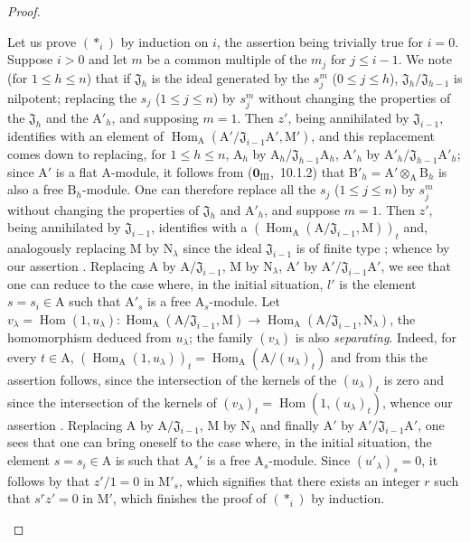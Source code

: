 \begin{proof}
\begin{enumerate}[label=(\roman*)]
  Let us prove $(*_i)$ by induction on $i$, the assertion being trivially true for $i=0$.
  Suppose $i>0$ and let $m$ be a common multiple of the $m_j$ for $j\leq i-1$.
  We note (for $1\leq h\leq n$) that if $\mathfrak{J}_h$ is the ideal generated by the $s_j^m$ ($0\leq j\leq h$), $\mathfrak{J}_h/\mathfrak{J}_{h-1}$ is nilpotent; replacing the $s_j$ ($1\leq j\leq n$) by $s_j^m$ without changing the properties of the $\mathfrak{J}_h$ and the $\mathrm{A}'_h$, and supposing $m=1$.
  Then $z'$, being annihilated by $\mathfrak{J}_{i-1}$, identifies with an element of $\operatorname{Hom}_\mathrm{A}(\mathrm{A}'/\mathfrak{J}_{i-1}\mathrm{A}',\mathrm{M}')$, and this replacement comes down to replacing, for $1\leq h\leq n$, $\mathrm{A}_h$ by $\mathrm{A}_h/\mathfrak{J}_{h-1}\mathrm{A}_h$, $\mathrm{A}'_h$ by $\mathrm{A}'_h/\mathfrak{J}_{h-1}\mathrm{A}'_h$; since $\mathrm{A}'$ is a flat $\mathrm{A}$-module, it follows from ($\mathbf{0}_{\mathrm{III}}$,~10.1.2) that $\mathrm{B}'_h=\mathrm{A}'\otimes_\mathrm{A}\mathrm{B}_h$ is also a free $\mathrm{B}_h$-module.
  One can therefore
  replace all the $s_j$ ($1\leq j\leq n$) by $s_j^m$ without changing the properties of $\mathfrak{J}_h$ and $\mathrm{A}'_h$, and suppose $m=1$.
  Then $z'$, being annihilated by $\mathfrak{J}_{i-1}$, identifies with a $(\operatorname{Hom}_\mathrm{A}(\mathrm{A}/\mathfrak{J}_{i-1},\mathrm{M}))_t$ and, analogously replacing $\mathrm{M}$ by $\mathrm{N}_\lambda$ since the ideal $\mathfrak{J}_{i-1}$ is of finite type ; whence by our assertion .
  Replacing $\mathrm{A}$ by $\mathrm{A}/\mathfrak{J}_{i-1}$, $\mathrm{M}$ by $\mathrm{N}_\lambda$, $\mathrm{A}'$ by $\mathrm{A}'/\mathfrak{J}_{i-1}\mathrm{A}'$, we see that one can reduce to the case where, in the initial situation, $l'$ is the element $s=s_i\in\mathrm{A}$ such that $\mathrm{A}'_s$ is a free $\mathrm{A}_s$-module.
  Let $v_\lambda=\operatorname{Hom}(1,u_\lambda):\operatorname{Hom}_\mathrm{A}(\mathrm{A}/\mathfrak{J}_{i-1},\mathrm{M})\to\operatorname{Hom}_\mathrm{A}(\mathrm{A}/\mathfrak{J}_{i-1},\mathrm{N}_\lambda)$, the homomorphism deduced from $u_\lambda$; the family $(v_\lambda)$ is also \emph{separating}.
  Indeed, for every $t\in\mathrm{A}$, $(\operatorname{Hom}_\mathrm{A}(1,u_\lambda))_t=\operatorname{Hom}_\mathrm{A}(\mathrm{A}/(u_\lambda)_t)$ and from this the assertion follows, since the intersection of the kernels of the $(u_\lambda)_t$ is zero and since the intersection of the kernels of $(v_\lambda)_t=\operatorname{Hom}(1,(u_\lambda)_t)$, whence our assertion .
  Replacing $\mathrm{A}$ by $\mathrm{A}/\mathfrak{J}_{i-1}$, $\mathrm{M}$ by $\mathrm{N}_\lambda$ and finally $\mathrm{A}'$ by $\mathrm{A}'/\mathfrak{J}_{i-1}\mathrm{A}'$, one sees that one can bring oneself to the case where, in the initial situation, the element $s=s_i\in\mathrm{A}$ is such that $\mathrm{A}_s'$ is a free $\mathrm{A}_s$-module.
  Since $(u'_\lambda)_s=0$, it follows by  that $z'/1=0$ in $\mathrm{M}'_s$, which signifies that there exists an integer $r$ such that $s^r z'=0$ in $\mathrm{M}'$, which finishes the proof of $(*_i)$ by induction.
  \medskip


\end{enumerate}
\end{proof}
